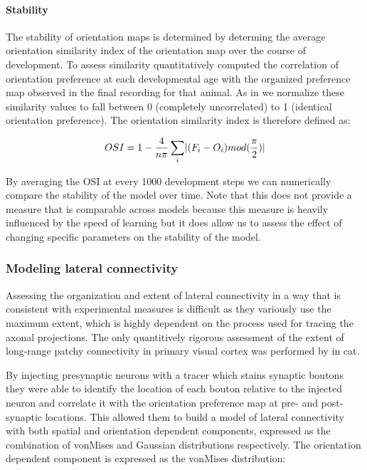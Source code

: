 \paragraph{Stability}

The stability of orientation maps is determined by determing the
average orientation similarity index of the orientation map over the
course of development. To assess similarity quantitatively
\cite{Chapman1996} computed the correlation of orientation preference
at each developmental age with the organized preference map observed
in the final recording for that animal. As in \cite{Stevens2013} we
normalize these similarity values to fall between 0 (completely
uncorrelated) to 1 (identical orientation preference). The orientation
similarity index is therefore defined as:

\begin{equation}
  OSI = 1 - \frac{4}{n\pi} \sum_{i}\lvert(F_{i}-O_{i})mod(\frac{\pi}{2})\rvert
\end{equation}

By averaging the OSI at every 1000 development steps we can
numerically compare the stability of the model over time. Note that
this does not provide a measure that is comparable across models
because this measure is heavily influenced by the speed of learning
but it does allow us to assess the effect of changing specific
parameters on the stability of the model.

\subsubsection{Modeling lateral connectivity}

Assessing the organization and extent of lateral connectivity in a way
that is consistent with experimental measures is difficult as they
variously use the maximum extent, which is highly dependent on the
process used for tracing the axonal projections. The only quantitively
rigorous assessment of the extent of long-range patchy connectivity in
primary visual cortex was performed by \cite{Buzas2006} in cat.

By injecting presynaptic neurons with a tracer which stains synaptic
boutons they were able to identify the location of each bouton
relative to the injected neuron and correlate it with the orientation
preference map at pre- and post-synaptic locations. This allowed them
to build a model of lateral connectivity with both spatial and
orientation dependent components, expressed as the combination of
vonMises and Gaussian distributions respectively. The orientation
dependent component is expressed as the vonMises distribution:

